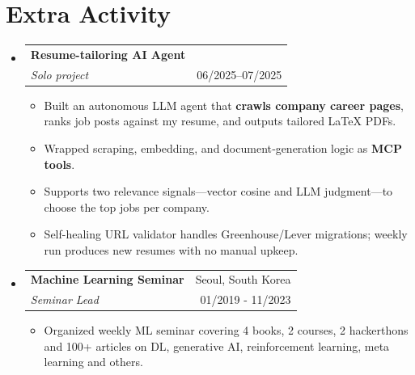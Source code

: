 \documentclass[letterpaper,11pt]{article}
\makeatletter
\newcommand{\cvitem}[1]{
  \item\small{
    {#1\vspace{-2pt}}
  }\hspace{-4pt}
}
\newcommand{\cvheading}[4]{
  \vspace{-2pt}\item
    \begin{tabular*}{\textwidth}[t]{l@{\extracolsep{\fill}}r}
      \textbf{#1} & #2 \\
      \textit{\small#3} & \small #4 \\
    \end{tabular*}\vspace{-7pt}
}
\newcommand{\cvheadingstart}{\begin{itemize}[leftmargin=0in, label={}]}
\newcommand{\cvheadingend}{\end{itemize}\vspace{-10pt}}
\newcommand{\cvitemstart}{\begin{itemize}\justifying}
\newcommand{\cvitemend}{\end{itemize}\vspace{-5pt}}
\newcommand{\cvskill}[2]{
  \textcolor{black}{\textbf{#1}}\hfill
  \foreach \x in {1,...,5}{%
    \space{\ifnumgreater{\x}{#2}{\color{black!80!white!20}}{\color{black}}\faSquare}}\par%
  \vspace{-2pt}
}
\makeatother
\begin{document}
\section{Extra Activity}
\cvheadingstart
  \cvheading
    {Resume-tailoring AI Agent}{}
    {Solo project}{06/2025–07/2025}
  \cvitemstart
    \cvitem{Built an autonomous LLM agent that \textbf{crawls company career pages}, ranks job posts against my resume, and outputs tailored LaTeX PDFs.}
    \cvitem{Wrapped scraping, embedding, and document‐generation logic as \textbf{MCP tools}.}
    \cvitem{Supports two relevance signals—vector cosine and LLM judgment—to choose the top jobs per company.}
    \cvitem{Self-healing URL validator handles Greenhouse/Lever migrations; weekly run produces new resumes with no manual upkeep.}
  \cvitemend
  \cvheading
    {Machine Learning Seminar}{Seoul, South Korea}
    {Seminar Lead}{01/2019 - 11/2023}
  \cvitemstart
    \cvitem{Organized weekly ML seminar covering 4 books, 2 courses, 2 hackerthons and 100+ articles on DL, generative AI, reinforcement learning, meta learning and others.}
  \cvitemend
\cvheadingend

\vspace{-5pt}
\end{document}

